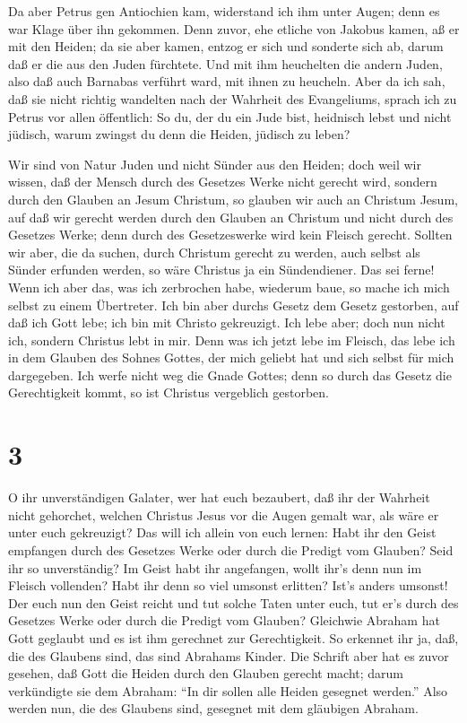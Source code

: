  Da aber Petrus gen Antiochien kam, widerstand ich ihm
unter Augen; denn es war Klage über ihn gekommen.  Denn
zuvor, ehe etliche von Jakobus kamen, aß er mit den Heiden; da sie aber
kamen, entzog er sich und sonderte sich ab, darum daß er die aus den
Juden fürchtete.  Und mit ihm heuchelten die andern Juden,
also daß auch Barnabas verführt ward, mit ihnen zu heucheln.
 Aber da ich sah, daß sie nicht richtig wandelten nach der
Wahrheit des Evangeliums, sprach ich zu Petrus vor allen öffentlich: So
du, der du ein Jude bist, heidnisch lebst und nicht jüdisch, warum
zwingst du denn die Heiden, jüdisch zu leben?

 Wir sind von Natur Juden und nicht Sünder aus den Heiden;
 doch weil wir wissen, daß der Mensch durch des Gesetzes
Werke nicht gerecht wird, sondern durch den Glauben an Jesum Christum,
so glauben wir auch an Christum Jesum, auf daß wir gerecht werden durch
den Glauben an Christum und nicht durch des Gesetzes Werke; denn durch
des Gesetzeswerke wird kein Fleisch gerecht.  Sollten wir
aber, die da suchen, durch Christum gerecht zu werden, auch selbst als
Sünder erfunden werden, so wäre Christus ja ein Sündendiener. Das sei
ferne!  Wenn ich aber das, was ich zerbrochen habe,
wiederum baue, so mache ich mich selbst zu einem Übertreter.
 Ich bin aber durchs Gesetz dem Gesetz gestorben, auf daß
ich Gott lebe; ich bin mit Christo gekreuzigt.  Ich lebe
aber; doch nun nicht ich, sondern Christus lebt in mir. Denn was ich
jetzt lebe im Fleisch, das lebe ich in dem Glauben des Sohnes Gottes,
der mich geliebt hat und sich selbst für mich dargegeben. 
Ich werfe nicht weg die Gnade Gottes; denn so durch das Gesetz die
Gerechtigkeit kommt, so ist Christus vergeblich gestorben.

\hypertarget{section-2}{%
\section{3}\label{section-2}}

 O ihr unverständigen Galater, wer hat euch bezaubert, daß
ihr der Wahrheit nicht gehorchet, welchen Christus Jesus vor die Augen
gemalt war, als wäre er unter euch gekreuzigt?  Das will ich
allein von euch lernen: Habt ihr den Geist empfangen durch des Gesetzes
Werke oder durch die Predigt vom Glauben?  Seid ihr so
unverständig? Im Geist habt ihr angefangen, wollt ihr's denn nun im
Fleisch vollenden?  Habt ihr denn so viel umsonst erlitten?
Ist's anders umsonst!  Der euch nun den Geist reicht und tut
solche Taten unter euch, tut er's durch des Gesetzes Werke oder durch
die Predigt vom Glauben?  Gleichwie Abraham hat Gott
geglaubt und es ist ihm gerechnet zur Gerechtigkeit.  So
erkennet ihr ja, daß, die des Glaubens sind, das sind Abrahams Kinder.
 Die Schrift aber hat es zuvor gesehen, daß Gott die Heiden
durch den Glauben gerecht macht; darum verkündigte sie dem Abraham: ``In
dir sollen alle Heiden gesegnet werden.''  Also werden nun,
die des Glaubens sind, gesegnet mit dem gläubigen Abraham.

